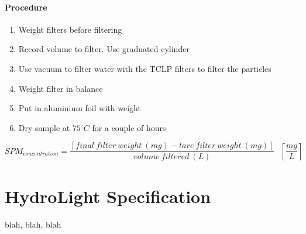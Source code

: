\begin{appendices}
\subsubsection{Procedure}
\begin{enumerate}
  \item Weight filters before filtering
  \item Record volume to filter. Use graduated cylinder
  \item Use vacuum to filter water with the TCLP filters to filter the particles
  \item Weight filter in balance
  \item Put in aluminium foil with weight
  \item Dry sample at $75^\circ C$ for a couple of hours
\end{enumerate}


\begin{equation}
SPM_{\displaystyle concentration} = \frac{[final~filter~weight~(mg) - tare~filter~weight~(mg)]}{volume~filtered~(L)}~~~\left[\frac{mg}{L}\right]
\end{equation}



\chapter{HydroLight Specification}

blah, blah, blah

\end{appendices}